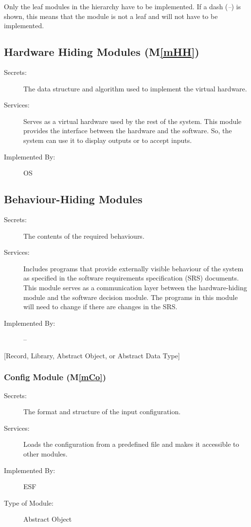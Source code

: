 \documentclass[12pt, titlepage]{article}
\newcommand{\ProjectName}{ESF }
\newcommand{\mref}[1]{M\ref{#1}}
\begin{document}
Only the leaf modules in the hierarchy have to be implemented. If a dash
(\emph{--}) is shown, this means that the module is not a leaf and will not have
to be implemented.

\subsection{Hardware Hiding Modules (\mref{mHH})}

\begin{description}
\item[Secrets:]The data structure and algorithm used to implement the virtual
  hardware.
\item[Services:]Serves as a virtual hardware used by the rest of the
  system. This module provides the interface between the hardware and the
  software. So, the system can use it to display outputs or to accept inputs.
\item[Implemented By:] OS
\end{description}

\subsection{Behaviour-Hiding Modules}

\begin{description}
\item[Secrets:]The contents of the required behaviours.
\item[Services:]Includes programs that provide externally visible behaviour of
  the system as specified in the software requirements specification (SRS)
  documents. This module serves as a communication layer between the
  hardware-hiding module and the software decision module. The programs in this
  module will need to change if there are changes in the SRS.
\item[Implemented By:] --
\end{description}

[Record, Library, Abstract Object, or Abstract Data Type]

\subsubsection{Config Module (\mref{mCo})}
\begin{description}
\item[Secrets:] The format and structure of the input configuration.
\item[Services:] Loads the configuration from a predefined file and makes it accessible to other modules.
\item[Implemented By:] \ProjectName{} 
\item[Type of Module:] Abstract Object
\end{description}
\end{document}

